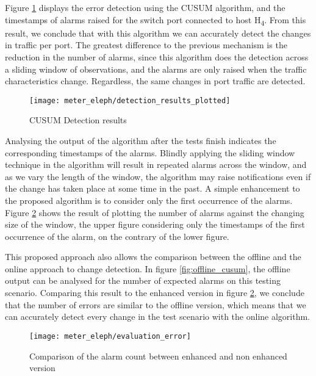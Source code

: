 \par Figure \ref{fig:color_plot} displays the error detection using the CUSUM algorithm, and the timestamps of alarms raised for the switch port connected to
host H\textsubscript{4}. From this result, we conclude that with this algorithm we can accurately detect the changes in traffic per port. The greatest difference to
the previous mechanism is the reduction in the number of alarms, since this algorithm does the detection across a sliding window of observations, and the alarms are
only raised when the traffic characteristics change. Regardless, the same changes in port traffic are detected.

\begin{figure}[H]
    \centering
    \texttt{[image: meter\_eleph/detection\_results\_plotted]}
    \caption{CUSUM Detection results}
    \label{fig:color_plot}
\end{figure}

\par Analysing the output of the algorithm after the tests finish indicates the corresponding timestamps of the alarms. Blindly applying the sliding window technique
in the algorithm will result in repeated alarms across the window, and as we vary the length of the window, the algorithm may raise notifications even if the change
has taken place at some time in the past. A simple enhancement to the proposed algorithm is to consider only the first occurrence of the alarms. Figure
\ref{fig:errors_comparaison} shows the result of plotting the number of alarms against the changing size of the window, the upper figure considering only the
timestamps of the first occurrence of the alarm, on the contrary of the lower figure.

\par This proposed approach also allows the comparison between the offline and the online approach to change detection. In figure \ref{fig:offline_cusum}, the 
offline output can be analysed for the number of expected alarms on this testing scenario. Comparing this result to the enhanced version in figure 
\ref{fig:errors_comparaison}, we conclude that the number of errors are similar to the offline version, which means that we can accurately detect every change in
the test scenario with the online algorithm.

\begin{figure}[H]
    \centering
    \texttt{[image: meter\_eleph/evaluation\_error]}
    \caption {Comparison of the alarm count between enhanced and non enhanced version}
    \label{fig:errors_comparaison}
\end{figure} 

